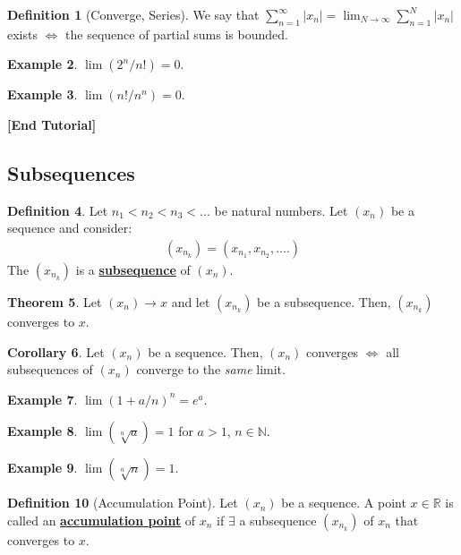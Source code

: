 \documentclass[reqno,11pt]{amsart}
\theoremstyle{definition}
\newtheorem{theorem}{Theorem}
\newtheorem{corollary}[theorem]{Corollary}
\theoremstyle{definition}
\newtheorem{definition}[theorem]{Definition}
\newtheorem{example}[theorem]{Example}
\theoremstyle{remark}
\newcommand{\R}{\mathbb{R}}
\newcommand{\N}{\mathbb{N}}
\newcommand{\dfn}[1]{\underline{\textbf{#1}}}
\begin{document}
\begin{definition}[Converge, Series]
	We say that $\sum_{n=1}^\infty |x_n| = \lim_{N \rightarrow \infty} \sum_{n=1}^N |x_n|$ exists $\iff$ the sequence of partial sums is bounded.
\end{definition}

\begin{example}
	$\lim(2^n/n!) =0$.
\end{example}

\begin{example}
	$\lim(n!/n^n) =0$.
\end{example}

\begin{center}
	\textbf{[End Tutorial]}
\end{center}

\subsection{Subsequences}

\begin{definition}
	Let $n_1 < n_2 < n_3 < ...$ be natural numbers. Let $(x_n)$ be a sequence and consider:
	\begin{align}
		(x_{n_k}) = (x_{n_1}, x_{n_2}, .... )	
	\end{align}
	The $(x_{n_k})$ is a \dfn{subsequence} of $(x_n)$.
\end{definition}

\begin{theorem}
	Let $(x_n) \rightarrow x$ and let $(x_{n_k})$ be a subsequence. Then, $(x_{n_k})$ converges to $x$.
\end{theorem}

\begin{corollary}
	Let $(x_n)$ be a sequence. Then, $(x_n)$ converges $\iff$ all subsequences of $(x_n)$ converge to the \emph{same} limit.
\end{corollary}

\begin{example}
	$\lim (1 + a/n)^n = e^a$.
\end{example}

\begin{example}
	$\lim (\sqrt[n]{a}) =1$ for $a > 1$, $n \in \N$.
\end{example}

\begin{example}
	$\lim (\sqrt[n]{n}) = 1$.
\end{example}

\begin{definition}[Accumulation Point]
	Let $(x_n)$ be a sequence. A point $x \in \R$ is called an \dfn{accumulation point} of $x_n$ if $\exists$ a subsequence $(x_{n_k})$ of $x_n$ that converges to $x$.
\end{definition}
\end{document}
